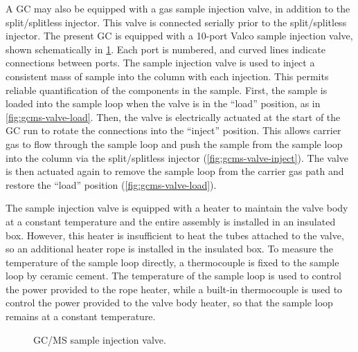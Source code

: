\documentclass[../main.tex]{subfiles}
\begin{document}
A GC may also be equipped with a gas sample injection valve, in addition to the
split/splitless injector. This valve is connected serially prior to the
split/splitless injector. The present GC is equipped with a 10-port Valco sample
injection valve, shown schematically in \cref{fig:gcms-valve}.
Each port is numbered, and curved lines indicate connections between ports.
The sample injection valve is used to inject a consistent mass of sample into the column
with each injection. This permits reliable quantification of the
components in the sample. First, the sample is loaded into the sample loop
when the valve is in the ``load'' position, as in \cref{fig:gcms-valve-load}.
Then, the valve is electrically actuated at the start of the
GC run to rotate the connections into the
``inject'' position. This allows carrier gas to flow through the sample loop and push
the sample from the sample loop into the column via the split/splitless injector (\cref{fig:gcms-valve-inject}).
The valve is then actuated again to remove the sample loop
from the carrier gas path and restore the ``load'' position (\cref{fig:gcms-valve-load}).

The sample injection valve is equipped with a heater to maintain
the valve body at a constant temperature and the entire assembly is installed
in an insulated box. However, this heater is insufficient
to heat the tubes attached to the valve, so an additional heater rope is installed
in the insulated box. To measure the temperature of the sample loop directly, a thermocouple
is fixed to the sample loop by ceramic cement. The temperature of the
sample loop is used to control the power provided to the rope heater,
while a built-in thermocouple is used to control the power provided
to the valve body heater, so that the sample loop remains at a constant temperature.

\begin{figure}
        {\caption{GC/MS sample injection valve.}
        \label{fig:gcms-valve}}
\end{figure}
\end{document}
